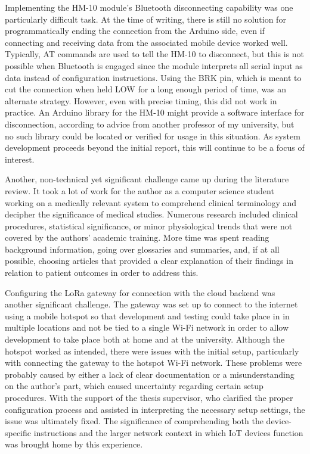 Implementing the HM-10 module's Bluetooth disconnecting capability was one particularly difficult task. At the time of writing, there is still no solution for programmatically ending the connection from the Arduino side, even if connecting and receiving data from the associated mobile device worked well. Typically, AT commands are used to tell the HM-10 to disconnect, but this is not possible when Bluetooth is engaged since the module interprets all serial input as data instead of configuration instructions. Using the BRK pin, which is meant to cut the connection when held LOW for a long enough period of time, was an alternate strategy. However, even with precise timing, this did not work in practice. An Arduino library for the HM-10 might provide a software interface for disconnection, according to advice from another professor of my university, but no such library could be located or verified for usage in this situation. As system development proceeds beyond the initial report, this will continue to be a focus of interest.

Another, non-technical yet significant challenge came up during the literature review. It took a lot of work for the author as a computer science student working on a medically relevant system to comprehend clinical terminology and decipher the significance of medical studies. Numerous research included clinical procedures, statistical significance, or minor physiological trends that were not covered by the authors' academic training. More time was spent reading background information, going over glossaries and summaries, and, if at all possible, choosing articles that provided a clear explanation of their findings in relation to patient outcomes in order to address this.

Configuring the LoRa gateway for connection with the cloud backend was another significant challenge. The gateway was set up to connect to the internet using a mobile hotspot so that development and testing could take place in in multiple locations and not be tied to a single Wi-Fi network in order to allow development to take place both at home and at the university. Although the hotspot worked as intended, there were issues with the initial setup, particularly with connecting the gateway to the hotspot Wi-Fi network. These problems were probably caused by either a lack of clear documentation or a misunderstanding on the author's part, which caused uncertainty regarding certain setup procedures. With the support of the thesis supervisor, who clarified the proper configuration process and assisted in interpreting the necessary setup settings, the issue was ultimately fixed. The significance of comprehending both the device-specific instructions and the larger network context in which IoT devices function was brought home by this experience.


